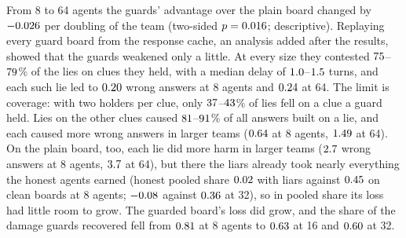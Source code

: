 \documentclass{article}
\begin{document}
From 8 to 64 agents the guards' advantage over the plain board changed by $-0.026$ per doubling of the team (two-sided $p = 0.016$; descriptive). Replaying every guard board from the response cache, an analysis added after the results, showed that the guards weakened only a little. At every size they contested $75$--$79$\% of the lies on clues they held, with a median delay of $1.0$--$1.5$ turns, and each such lie led to $0.20$ wrong answers at 8 agents and $0.24$ at 64. The limit is coverage: with two holders per clue, only $37$--$43$\% of lies fell on a clue a guard held. Lies on the other clues caused $81$--$91$\% of all answers built on a lie, and each caused more wrong answers in larger teams ($0.64$ at 8 agents, $1.49$ at 64). On the plain board, too, each lie did more harm in larger teams ($2.7$ wrong answers at 8 agents, $3.7$ at 64), but there the liars already took nearly everything the honest agents earned (honest pooled share $0.02$ with liars against $0.45$ on clean boards at 8 agents; $-0.08$ against $0.36$ at 32), so in pooled share its loss had little room to grow. The guarded board's loss did grow, and the share of the damage guards recovered fell from $0.81$ at 8 agents to $0.63$ at 16 and $0.60$ at 32.
\end{document}
